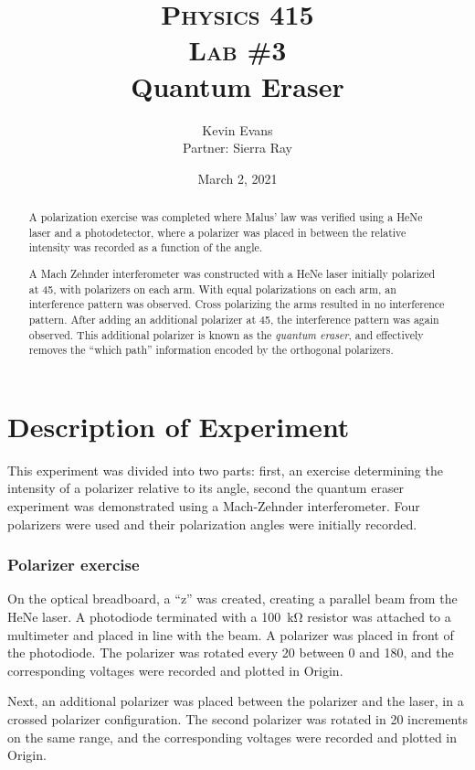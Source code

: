 \documentclass[notitlepage]{report}
\title{
	\textsc{ \small
		Physics 415
	} \\
	{\textsc{\small Lab \#3}} \\
	Quantum Eraser
}
\author{Kevin Evans \\ Partner: Sierra Ray}
\date{March 2, 2021}
\begin{document}
	\begin{titlingpage}
		\maketitle
		\begin{abstract}
			\noindent A polarization exercise was completed where Malus' law was verified using a HeNe laser and a photodetector, where a polarizer was placed in between the relative intensity was recorded as a function of the angle. 
			
			A Mach Zehnder interferometer was constructed with a HeNe laser initially polarized at \SI{45}{\deg}, with polarizers on each arm. With equal polarizations on each arm, an interference pattern was observed. Cross polarizing the arms resulted in no interference pattern. After adding an additional polarizer at \SI{45}{\deg}, the interference pattern was again observed. This additional polarizer is known as the \textit{quantum eraser}, and effectively removes the ``which path'' information encoded by the orthogonal polarizers.
		\end{abstract}
	\end{titlingpage}
	
	\section{Description of Experiment}
	This experiment was divided into two parts: first, an exercise determining the intensity of a polarizer relative to its angle, second the quantum eraser experiment was demonstrated using a Mach-Zehnder interferometer. Four polarizers were used and their polarization angles were initially recorded.
	
	\subsubsection{Polarizer exercise}
	On the optical breadboard, a ``z'' was created, creating a parallel beam from the HeNe laser. A photodiode terminated with a \SI{100}{\kohm} resistor was attached to a multimeter and placed in line with the beam. A polarizer was placed in front of the photodiode. The polarizer was rotated every \SI{20}{\deg} between $0$ and \SI{180}{\deg}, and the corresponding voltages were recorded and plotted in Origin.
	
	Next, an additional polarizer was placed between the polarizer and the laser, in a crossed polarizer configuration. The second polarizer was rotated in \SI{20}{\deg} increments on the same range, and the corresponding voltages were recorded and plotted in Origin.
	
\end{document}
